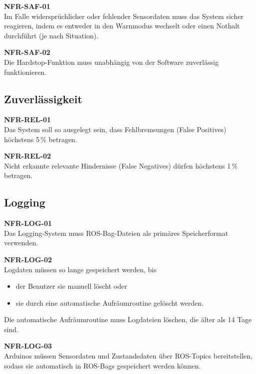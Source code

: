 \textbf{NFR-SAF-01}\\
Im Falle widersprüchlicher oder fehlender Sensordaten muss das System sicher reagieren, indem es entweder in den Warnmodus wechselt oder einen Nothalt durchführt (je nach Situation).

\textbf{NFR-SAF-02}\\
Die \ac{Hardstop}-Funktion muss unabhängig von der Software zuverlässig funktionieren.


\subsection{Zuverlässigkeit}
\label{sec:nfr_reliability}

\textbf{NFR-REL-01}\\
Das System soll so ausgelegt sein, dass Fehlbremsungen (False Positives) höchstens 5\,\% betragen.

\textbf{NFR-REL-02}\\
Nicht erkannte relevante Hindernisse (False Negatives) dürfen höchstens 1\,\% betragen.


\subsection{Logging}
\label{sec:nfr_logging}

\textbf{NFR-LOG-01}\\
Das Logging-System muss ROS-Bag-Dateien als primäres Speicherformat verwenden.

\textbf{NFR-LOG-02}\\
Logdaten müssen so lange gespeichert werden, bis
\begin{itemize}
    \item der Benutzer sie manuell löscht oder
    \item sie durch eine automatische Aufräumroutine gelöscht werden.
\end{itemize}
Die automatische Aufräumroutine muss Logdateien löschen, die älter als 14 Tage sind.

\textbf{NFR-LOG-03}\\
Arduinos müssen Sensordaten und Zustandsdaten über ROS-Topics bereitstellen, sodass sie automatisch in ROS-Bags gespeichert werden können.
